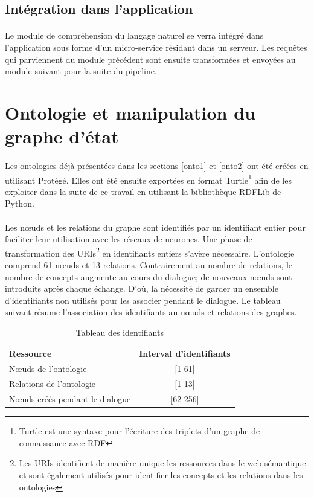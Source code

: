	\subsection{Intégration dans l'application}
	\paragraph{}
	Le module de compréhension du langage naturel se verra intégré dans l'application sous forme d'un micro-service résidant dans un serveur. Les requêtes qui parviennent du module précédent sont ensuite transformées et envoyées au module suivant pour la suite du pipeline.

\section{Ontologie et manipulation du graphe d'état}
\paragraph{}Les ontologies déjà présentées dans les sections \ref{onto1} et \ref{onto2} ont été créées en utilisant Protégé. Elles ont été ensuite exportées en format Turtle\footnote{Turtle est une syntaxe pour l'écriture des triplets d'un graphe de connaissance avec RDF} afin de les exploiter dans la suite de ce travail en utilisant la bibliothèque RDFLib de Python.
\paragraph{}Les n\oe{}uds et les relations du graphe sont identifiés par un identifiant entier pour faciliter leur utilisation avec les réseaux de neurones. Une phase de transformation des URIs\footnote{Les URIs identifient de manière unique les ressources dans le web sémantique et sont également utilisés pour identifier les concepts et les relations dans les ontologies} en identifiants entiers s'avère nécessaire. L'ontologie comprend 61 n\oe{}uds et 13 relations. Contrairement au nombre de relations, le nombre de concepts augmente au cours du dialogue; de nouveaux n\oe{}uds sont introduits après chaque échange. D'où, la nécessité de garder un ensemble d'identifiants non utilisés pour les associer pendant le dialogue. Le tableau suivant résume l'association des identifiants au n\oe{}uds et relations des graphes.
\begin{table}[H]
	\begin{center}
		
		\begin{tabular}{|l|c|}
			\hline
			\textbf{Ressource} & \textbf{Interval d'identifiants}\\
			\hline
			N\oe{}uds de l'ontologie & [1-61]\\
			\hline
			Relations de l'ontologie & [1-13]\\
			\hline
			N\oe{}uds créés pendant le dialogue & [62-256]\\
			\hline
		\end{tabular}
		\caption{Tableau des identifiants}\label{table_ids}
	\end{center}
\end{table}
